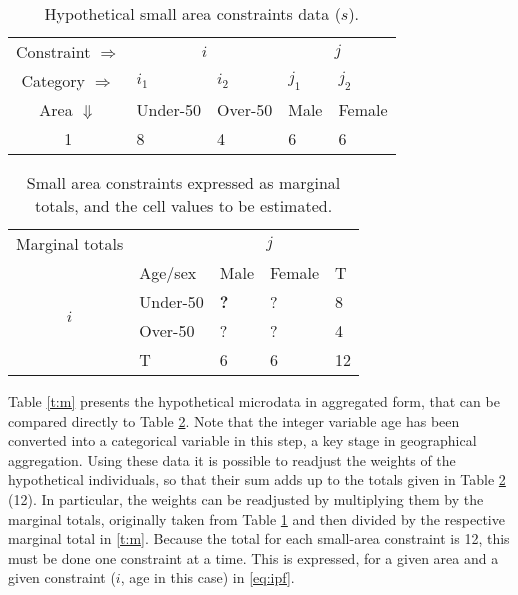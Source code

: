 \documentclass[a4paper,10pt]{article}
\begin{document}
\begin{table}[!htbp]
\caption{Hypothetical small area constraints data ($s$).}
\begin{center}
\begin{tabular}{cllll}
\toprule
Constraint $\Rightarrow$ & \multicolumn{2}{c}{$i$}& \multicolumn{2}{c}{$j$}\\
Category $\Rightarrow$ & $i_1$ & $i_2$ & $j_1$ & $j_2$ \\
Area $\Downarrow$  & Under-50 & Over-50 &  Male & Female\\
1  & 8 & 4 & 6 & 6\\
\bottomrule
\end{tabular}
\end{center}
\label{t:s}
\end{table}
\vspace{1cm}

\begin{table}[!htbp]
\caption[Small area constraints expressed as marginal totals]{Small
area constraints expressed as marginal totals, and the cell
values to be estimated.}
\begin{center}
\begin{tabular}{cllll}\toprule
Marginal totals&  & \multicolumn{2}{c}{$j$} & \\
& Age/sex & Male & Female & T\\ \midrule
\multirow{2}{*}{$i$} & Under-50 & \textbf{?} & ? & 8\\
& Over-50 & ? & ? &4 \\
& T & 6 & 6 &12\\
\bottomrule
\end{tabular}
\label{t:s2}
\end{center}
\end{table}

\FloatBarrier

Table \ref{t:m} presents the
hypothetical microdata in aggregated form,
that can be compared directly to Table \ref{t:s2}.
Note that the integer variable age has been converted into
a categorical variable in this step, a key stage in geographical aggregation.
Using these data it is possible to readjust the weights of the hypothetical
individuals, so that their sum adds up to the totals given in Table
\ref{t:s2} (12). In particular, the weights can be readjusted by multiplying them by
the marginal totals, originally taken from
Table \ref{t:s} and then divided by the respective marginal total in \ref{t:m}.
Because the total for each small-area constraint is 12, this must be
done one constraint at a time. This
is expressed, for a given area and a given constraint ($i$, age in this case)
in \cref{eq:ipf}.
\end{document}
